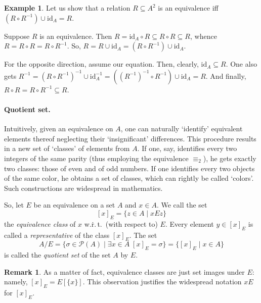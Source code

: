 \documentclass[12pt,notitlepage]{article}
\theoremstyle{plain}
\theoremstyle{definition}
\newtheorem{exm}[thm]{Example}
\newtheorem{rem}[thm]{Remark}
\theoremstyle{plain}
\newcommand{\sbs}{\subseteq}
\newcommand{\mP}{\mathcal{P}}
\newcommand{\id}{\mathrm{id}}
\newcommand{\1}{\mathbf{1}}
\newcommand{\0}{\mathbf{0}}
\begin{document}
%
%
\begin{exm}
Let us show that a relation $R \sbs A^2$ is an equivalence iff $(R \circ R^{-1}) \cup \id_A = R$.

Suppose $R$ is an equivalence. Then $R = \id_A \circ R \sbs R \circ R \sbs R$, whence $R = R \circ R = R \circ R^{-1}$. So, $R = R \cup \id_A = (R \circ R^{-1}) \cup \id_A$.

For the opposite direction, assume our equation. Then, clearly, $\id_A \sbs R$. One also gets $R^{-1} = (R \circ R^{-1})^{-1} \cup \id^{-1}_A = ((R^{-1})^{-1} \circ R^{-1}) \cup \id_A = R$. And finally, $R \circ R = R \circ R^{-1} \sbs R$.
\end{exm}

\paragraph{Quotient set.} Intuitively, given an equivalence on $A$, one can naturally `identify' equivalent elements thereof neglecting their `insignificant' differences. This procedure results in a new set of `classes' of elements from $A$. If one, say, identifies every two integers of the same parity (thus employing the equivalence ${\equiv_2}$), he gets exactly two classes: those of even and of odd numbers. If one identifies every two objects of the same color, he obtains a set of classes, which can rightly be called  `colors'. Such constructions are widespread in mathematics.

So, let $E$ be an equivalence on a set $A$ and $x \in A$. We call the set
$$[x]_E = \{ z \in A \mid x E z \}$$
the \emph{equivalence class} of $x$ w.\.r.\,t.\ (with respect to) $E$. Every element $y \in [x]_E$ is called a \emph{representative} of the class $[x]_E$. The set
$$A/E = \{ \sigma \in \mP(A) \mid \exists x \in A\; [x]_E = \sigma \}  =  \{[x]_E \mid x \in A\}$$
is called the \emph{quotient set} of the set $A$ by $E$.
\begin{rem}
As a matter of fact, equivalence classes are just set images under $E$: namely, $[x]_E = E[\{x\}]$. This observation justifies the widespread notation $xE$ for $[x]_E$.
\end{rem}
\end{document}
